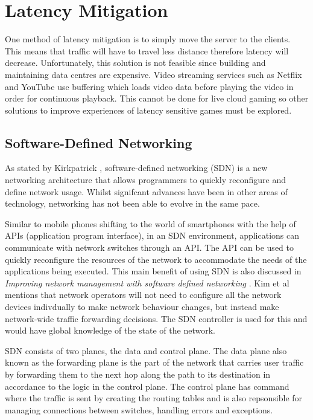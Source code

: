 \section{Latency Mitigation}
One method of latency mitigation is to simply move the server to the clients. This means that traffic will have to travel less distance therefore latency will decrease. Unfortunately, this solution is not feasible since building and maintaining data centres are expensive. Video streaming services such as Netflix and YouTube use buffering which loads video data before playing the video in order for continuous playback. This cannot be done for live cloud gaming so other solutions to improve experiences of latency sensitive games must be explored.

\subsection{Software-Defined Networking}
As stated by Kirkpatrick \cite{kirkpatrick2013software}, software-defined networking (SDN) is a new networking architecture that allows programmers to quickly reconfigure and define network usage. Whilst signifcant advances have been in other areas of technology, networking has not been able to evolve in the same pace.
\newline
\par
Similar to mobile phones shifting to the world of smartphones with the help of APIs (application program interface), in an SDN environment, applications can communicate with network switches through an API. The API can be used to quickly reconfigure the resources of the network to accommodate the needs of the applications being executed. This main benefit of using SDN is also discussed in \textit{Improving network management with software defined networking} \cite{kim2013improving}. Kim et al mentions that network operators will not need to configure all the network devices indivdually to make network behaviour changes, but instead make network-wide traffic forwarding decisions. The SDN controller is used for this and would have global knowledge of the state of the network.
\newline
\par
SDN consists of two planes, the data and control plane. The data plane also known as the forwarding plane is the part of the network that carries user traffic by forwarding them to the next hop along the path to its destination in accordance to the logic in the control plane. The control plane has command where the traffic is sent by creating the routing tables and is also repsonsible for managing connections between switches, handling errors and exceptions.

